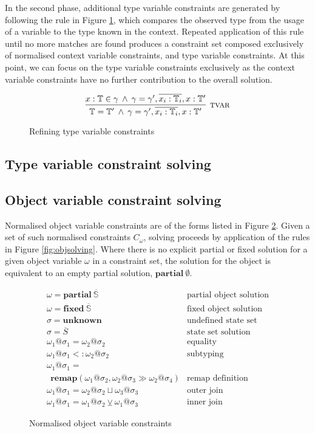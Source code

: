 \documentclass[preprint]{sigplanconf}
\makeatletter
\newcommand{\figref}[1]{Figure \ref{#1}}
\newcommand{\remapapp}[3]{\ensuremath{\mathbf{remap}(#1, #2 \gg #3)}}
\newcommand{\cand}{\:\wedge\:}
\newcommand{\partialo}[2]{\mathbf{partial}\:\overline{\mathbb{S}_{#1}{#2}}}
\newcommand{\fixedo}[2]{\mathbf{fixed}\:\overline{\mathbb{S}_{#1}{#2}}}
\newcommand{\os}[2]{\omega_{#1}@\sigma_{#2}}
\newcommand{\tinf}{\mathbb{T}}
\makeatother
\begin{document}
In the second phase, additional type variable 
constraints are generated by following the rule in \figref{fig:tvargen}, which
compares the observed type from the usage of a variable to the type
known in the context. Repeated application of this rule until no more matches
are found produces a constraint set composed exclusively of normalised
context variable constraints, and type variable constraints. At this point, 
we can focus on the type variable constraints exclusively as the context
variable constraints have no further contribution to the overall solution.

\begin{figure}
\[
	\infer[\textsc{tvar}]
	{\tinf = \tinf' \cand \gamma = \gamma', \overline{x_i : \tinf_i}, x : \tinf'}
	{x : \tinf \in \gamma \cand \gamma = \gamma', \overline{x_i : \tinf_i}, x : \tinf'}
\]
\caption{\label{fig:tvargen} Refining type variable constraints}
\end{figure}

\subsection{Type variable constraint solving}


\subsection{Object variable constraint solving}

Normalised object variable constraints are of the forms listed in
\figref{fig:objconstraints}. Given a set of such normalised
constraints $C_\omega$, solving proceeds by application of the rules in
\figref{fig:objsolving}. Where there is no
explicit partial or fixed solution for a given object variable $\omega$ in
a constraint set, the solution for the object is equivalent to an empty partial solution, $\mathbf{partial}\:\emptyset$.

\begin{figure}
\[
\begin{array}{ll}
\omega = \partialo{}{} 
	& \text{partial object solution}
	\\
\omega = \fixedo{}{}
	& \text{fixed object solution} 
	\\
\sigma = \mathbf{unknown}
	& \text{undefined state set}
	\\
\sigma = \overline{S} 
	& \text{state set solution} 
	\\
\os{1}{1} = \os{2}{2} 
	& \text{equality} 
	\\
\os{1}{1} <: \os{2}{2} 
	& \text{subtyping} 
	\\
\os{1}{1} = \\
\:\:\remapapp{\os{1}{2}}{\os{2}{3}}{\os{2}{4}} 
	& \text{remap definition}
	\\
\os{1}{1} = \os{2}{2} \sqcup \os{3}{3}
	& \text{outer join}
	\\
\os{1}{1} = \os{1}{2} \veebar \os{1}{3}
	& \text{inner join}
\end{array}
\]
\caption{\label{fig:objconstraints} Normalised object variable constraints}
\end{figure}
\end{document}
